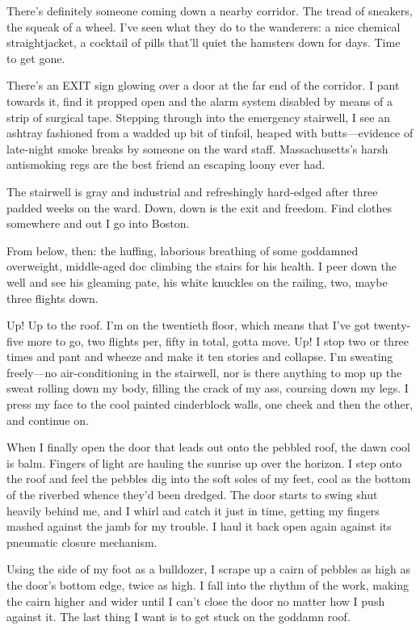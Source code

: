 There’s definitely someone coming down a nearby corridor. The tread
of sneakers, the squeak of a wheel. I’ve seen what they do to the
wanderers: a nice chemical straightjacket, a cocktail of pills
that’ll quiet the hamsters down for days. Time to get gone.

There’s an EXIT sign glowing over a door at the far end of the
corridor. I pant towards it, find it propped open and the alarm
system disabled by means of a strip of surgical tape. Stepping
through into the emergency stairwell, I see an ashtray fashioned
from a wadded up bit of tinfoil, heaped with butts—evidence of
late-night smoke breaks by someone on the ward staff.
Massachusetts’s harsh antismoking regs are the best friend an
escaping loony ever had.

The stairwell is gray and industrial and refreshingly hard-edged
after three padded weeks on the ward. Down, down is the exit and
freedom. Find clothes somewhere and out I go into Boston.

From below, then: the huffing, laborious breathing of some
goddamned overweight, middle-aged doc climbing the stairs for his
health. I peer down the well and see his gleaming pate, his white
knuckles on the railing, two, maybe three flights down.

Up! Up to the roof. I’m on the twentieth floor, which means that
I’ve got twenty-five more to go, two flights per, fifty in total,
gotta move. Up! I stop two or three times and pant and wheeze and
make it ten stories and collapse. I’m sweating freely—no
air-conditioning in the stairwell, nor is there anything to mop up
the sweat rolling down my body, filling the crack of my ass,
coursing down my legs. I press my face to the cool painted
cinderblock walls, one cheek and then the other, and continue on.

When I finally open the door that leads out onto the pebbled roof,
the dawn cool is balm. Fingers of light are hauling the sunrise up
over the horizon. I step onto the roof and feel the pebbles dig
into the soft soles of my feet, cool as the bottom of the riverbed
whence they’d been dredged. The door starts to swing shut heavily
behind me, and I whirl and catch it just in time, getting my
fingers mashed against the jamb for my trouble. I haul it back open
again against its pneumatic closure mechanism.

Using the side of my foot as a bulldozer, I scrape up a cairn of
pebbles as high as the door’s bottom edge, twice as high. I fall
into the rhythm of the work, making the cairn higher and wider
until I can’t close the door no matter how I push against it. The
last thing I want is to get stuck on the goddamn roof.

